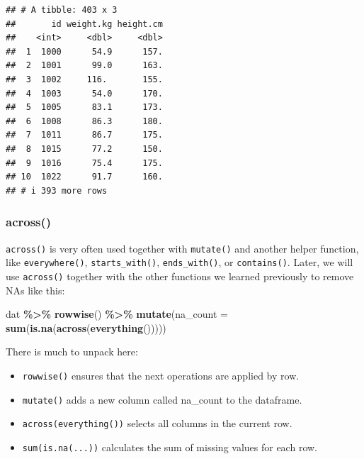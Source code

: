 \documentclass[
]{book}
\newenvironment{Shaded}{\begin{snugshade}}{\end{snugshade}}
\newcommand{\AttributeTok}[1]{\textcolor[rgb]{0.13,0.29,0.53}{#1}}
\newcommand{\FunctionTok}[1]{\textcolor[rgb]{0.13,0.29,0.53}{\textbf{#1}}}
\newcommand{\NormalTok}[1]{#1}
\newcommand{\SpecialCharTok}[1]{\textcolor[rgb]{0.81,0.36,0.00}{\textbf{#1}}}
\providecommand{\tightlist}{%
  \setlength{\itemsep}{0pt}\setlength{\parskip}{0pt}}
\begin{document}
\begin{verbatim}
## # A tibble: 403 x 3
##       id weight.kg height.cm
##    <int>     <dbl>     <dbl>
##  1  1000      54.9      157.
##  2  1001      99.0      163.
##  3  1002     116.       155.
##  4  1003      54.0      170.
##  5  1005      83.1      173.
##  6  1008      86.3      180.
##  7  1011      86.7      175.
##  8  1015      77.2      150.
##  9  1016      75.4      175.
## 10  1022      91.7      160.
## # i 393 more rows
\end{verbatim}

\hypertarget{across}{%
\subsubsection{across()}\label{across}}

\texttt{across()} is very often used together with \texttt{mutate()} and another helper function, like \texttt{everywhere()}, \texttt{starts\_with()}, \texttt{ends\_with()}, or \texttt{contains()}.
Later, we will use \texttt{across()} together with the other functions we learned previously to remove NAs like this:

\begin{Shaded}
\begin{Highlighting}[]
\NormalTok{dat }\SpecialCharTok{\%\textgreater{}\%}
  \FunctionTok{rowwise}\NormalTok{() }\SpecialCharTok{\%\textgreater{}\%}
  \FunctionTok{mutate}\NormalTok{(}\AttributeTok{na\_count =} \FunctionTok{sum}\NormalTok{(}\FunctionTok{is.na}\NormalTok{(}\FunctionTok{across}\NormalTok{(}\FunctionTok{everything}\NormalTok{()))))}
\end{Highlighting}
\end{Shaded}

There is much to unpack here:

\begin{itemize}
\tightlist
\item
  \texttt{rowwise()} ensures that the next operations are applied by row.\\
\item
  \texttt{mutate()} adds a new column called na\_count to the dataframe.\\
\item
  \texttt{across(everything())} selects all columns in the current row.\\
\item
  \texttt{sum(is.na(...))} calculates the sum of missing values for each row.
\end{itemize}
\end{document}
